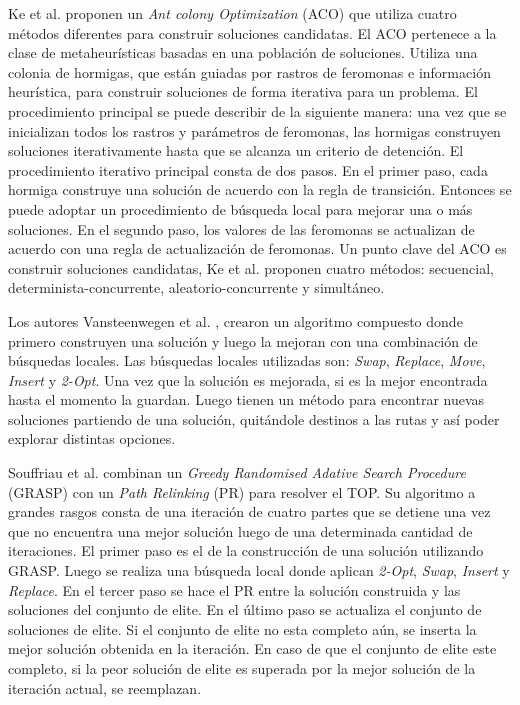 \bigskip

Ke et al. \cite{KeArchettiFeng} proponen un \textit{Ant colony Optimization} (ACO) que utiliza cuatro métodos diferentes para construir soluciones candidatas. El ACO pertenece a la clase de metaheurísticas basadas en una población de soluciones. Utiliza una colonia de hormigas, que están guiadas por rastros de feromonas e información heurística, para construir soluciones de forma iterativa para un problema. El procedimiento principal se puede describir de la siguiente manera: una vez que se inicializan todos los rastros y parámetros de feromonas, las hormigas construyen soluciones iterativamente hasta que se alcanza un criterio de detención. El procedimiento iterativo principal consta de dos pasos. En el primer paso, cada hormiga construye una solución de acuerdo con la regla de transición. Entonces se puede adoptar un procedimiento de búsqueda local para mejorar una o más soluciones. En el segundo paso, los valores de las feromonas se actualizan de acuerdo con una regla de actualización de feromonas. Un punto clave del ACO es construir soluciones candidatas, Ke et al. proponen cuatro métodos: secuencial, determinista-concurrente, aleatorio-concurrente y simultáneo.

\bigskip

Los autores Vansteenwegen et al. \cite{VansteenwegenSouffriauBergheOudheusden}, crearon un algoritmo compuesto donde primero construyen una solución y luego la mejoran con una combinación de búsquedas locales. Las búsquedas locales utilizadas son: \textit{Swap}, \textit{Replace}, \textit{Move}, \textit{Insert} y \textit{2-Opt}. Una vez que la solución es mejorada, si es la mejor encontrada hasta el momento la guardan. Luego tienen un método para encontrar nuevas soluciones partiendo de una solución, quitándole destinos a las rutas y así poder explorar distintas opciones.

\bigskip

Souffriau et al. \cite{SouffriauVansteenwegenBergheOudheusden} combinan un \textit{Greedy Randomised Adative Search Procedure} (GRASP) con un \textit{Path Relinking} (PR) para resolver el TOP. Su algoritmo a grandes rasgos consta de una iteración de cuatro partes que se detiene una vez que no encuentra una mejor solución luego de una determinada cantidad de iteraciones. El primer paso es el de la construcción de una solución utilizando GRASP. Luego se realiza una búsqueda local donde aplican \textit{2-Opt}, \textit{Swap}, \textit{Insert} y \textit{Replace}. En el tercer paso se hace el PR entre la solución construida y las soluciones del conjunto de elite. En el último paso se actualiza el conjunto de soluciones de elite. Si el conjunto de elite no esta completo aún, se inserta la mejor solución obtenida en la iteración. En caso de que el conjunto de elite este completo, si la peor solución de elite es superada por la mejor solución de la iteración actual, se reemplazan.

